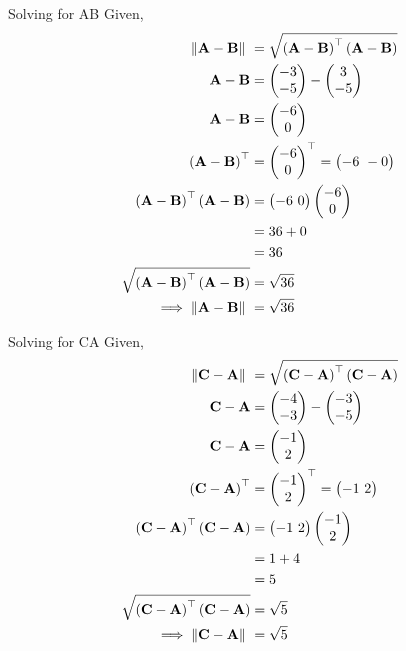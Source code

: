 \documentclass[11pt]{book}
\begin{document}
\begin{enumerate}[label=\thesection.\arabic*.,ref=\thesection.\theenumi]
Solving for AB 
Given, 
\begin{align}  
 \norm{\vec{A}-\vec{B}}\ &=  \sqrt{\brak{\vec{A}-\vec{B}}^{\top}\brak{\vec{A}-\vec{B}}} \\
 \vec{A}-\vec{B} &= \myvec{-3 \\ -5} - \myvec{3 \\ -5} \\
 \vec{A}-\vec{B} &= \myvec{-6 \\ 0} \\
 \brak{\vec{A}-\vec{B}}^{\top} &= {\myvec{-6 \\ 0}}^{\top} = \myvec{-6 \ -0} \\
\brak{\vec{A}-\vec{B}}^{\top}\brak{\vec{A}-\vec{B}} &= \myvec{-6 \ 0} \myvec{-6 \\ 0}\\
             &= 36 + 0 \\
             &= 36 \\  
	\sqrt{\brak{\vec{A}-\vec{B}}^{\top}\brak{\vec{A}-\vec{B}}} &= \sqrt{36}	\\
	\implies \norm{\vec{A}-\vec{B}}\ &= \sqrt{36} 
\end{align}

Solving for CA
Given, 
\begin{align}  
	\norm{\vec{C}-\vec{A}}\ &=  \sqrt{\brak{\vec{C}-\vec{A}}^{\top}\brak{\vec{C}-\vec{A}}} \\
 \vec{C}-\vec{A} &= \myvec{-4 \\ -3} - \myvec{-3 \\ -5} \\
 \vec{C}-\vec{A} &= \myvec{-1 \\ 2} \\
 \brak{\vec{C}-\vec{A}}^{\top} &= {\myvec{-1 \\ 2}}^{\top} = \myvec{-1 \ 2} \\
	\brak{\vec{C}-\vec{A}}^{\top}\brak{\vec{C}-\vec{A}} &= \myvec{-1 \ 2} \myvec{-1 \\ 2}\\
             &= 1 + 4 \\
             &= 5 \\  
	\sqrt{\brak{\vec{C}-\vec{A}}^{\top}\brak{\vec{C}-\vec{A}}} &= \sqrt{5}	\\
	\implies \norm{\vec{C}-\vec{A}}\ &= \sqrt{5} 
\end{align}




\end{enumerate}
\end{document}
